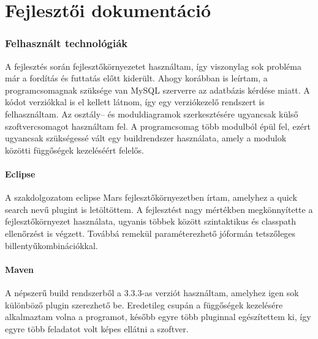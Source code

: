 \part{Fejlesztői dokumentáció}

\section{Felhasznált technológiák}
A fejlesztés során fejlesztőkörnyezetet használtam, így viszonylag sok probléma már a fordítás és futtatás előtt kiderült. Ahogy korábban is leírtam, a programcsomagnak szüksége van MySQL szerverre az adatbázis kérdése miatt. A kódot verziókkal is el kellett látnom, így egy verziókezelő rendszert is felhasználtam. Az osztály-- és moduldiagramok szerkesztésére ugyancsak külső szoftvercsomagot használtam fel. A programcsomag több modulból épül fel, ezért ugyancsak szükségessé vált egy buildrendszer használata, amely a modulok közötti függőségek kezeléséért felelős.

\subsection{Eclipse}
A szakdolgozatom eclipse Mars \cite{eclipse_mars} fejlesztőkörnyezetben írtam, amelyhez a quick search \cite{quick_search} nevű plugint is letöltöttem. A fejlesztést nagy mértékben megkönnyítette a fejlesztőkörnyezet használata, ugyanis többek között szintaktikus és classpath ellenőrzést is végzett. Továbbá remekül paraméterezhető jóformán tetszőleges billentyűkombinációkkal.

\subsection{Maven}
A népszerű build rendszerből a 3.3.3-as verziót használtam, amelyhez igen sok különböző plugin szerezhető be. Eredetileg csupán a függőségek kezelésére alkalmaztam volna a programot, később egyre több pluginnal egészítettem ki, így egyre több feladatot volt képes ellátni a szoftver.

